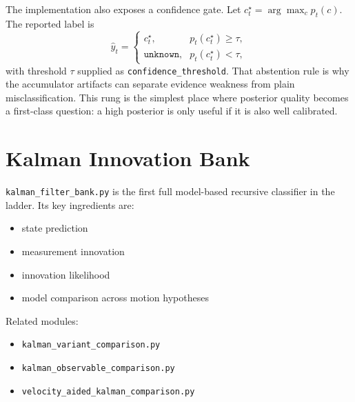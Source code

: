 \documentclass[11pt]{article}
\begin{document}
The implementation also exposes a confidence gate. Let
\(c^\star_t = \arg\max_c p_t(c)\). The reported label is
\begin{equation}
    \hat{y}_t =
    \begin{cases}
        c^\star_t, & p_t(c^\star_t) \ge \tau, \\
        \texttt{unknown}, & p_t(c^\star_t) < \tau,
    \end{cases}
\end{equation}
with threshold \(\tau\) supplied as \texttt{confidence\_threshold}. That
abstention rule is why the accumulator artifacts can separate evidence weakness
from plain misclassification.
This rung is the simplest place where posterior quality becomes a first-class
question: a high posterior is only useful if it is also well calibrated.

\section{Kalman Innovation Bank}

\texttt{kalman\_filter\_bank.py} is the first full model-based recursive
classifier in the ladder. Its key ingredients are:
\begin{itemize}[leftmargin=1.5em]
    \item state prediction
    \item measurement innovation
    \item innovation likelihood
    \item model comparison across motion hypotheses
\end{itemize}

Related modules:
\begin{itemize}[leftmargin=1.5em]
    \item \texttt{kalman\_variant\_comparison.py}
    \item \texttt{kalman\_observable\_comparison.py}
    \item \texttt{velocity\_aided\_kalman\_comparison.py}
\end{itemize}
\end{document}
